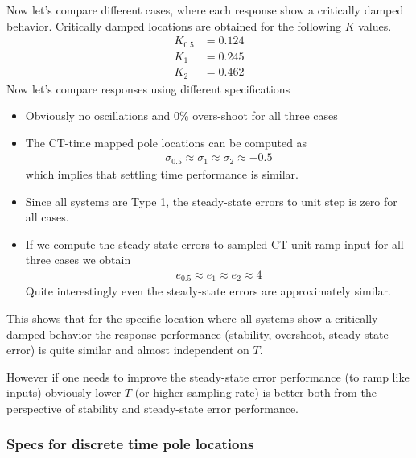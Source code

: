 \documentclass[twoside]{article}
\begin{document}
Now let's compare different cases, where each response
show a critically damped
behavior. Critically damped locations are obtained for
the following $K$ values. 
%
\begin{align*}
  K_{0.5} &= 0.124 \\
  K_{1} &= 0.245 \\
  K_{2} &= 0.462
\end{align*}
%
Now let's compare responses using different specifications
%
\begin{itemize}
  \item Obviously no oscillations and $0 \%$ overs-shoot for all three
    cases
  \item The CT-time mapped pole locations can be computed as
   \begin{align*}
  \sigma_{0.5} \approx \sigma_{1} \approx \sigma_{2} \approx -0.5
\end{align*}
    which implies that settling time performance is similar.

   \item Since all systems are Type 1, the steady-state errors to unit
     step is zero for all cases.

   \item If we compute the steady-state errors to sampled CT 
    unit ramp input for all three cases we obtain
%
\begin{align*}
e_{0.5} \approx e_{1} \approx e_{2} \approx 4
\end{align*}
%
Quite interestingly even the steady-state errors are
approximately similar. 
%
\end{itemize}
%
This shows that for the specific location where all
systems show a critically damped behavior
the response performance (stability, overshoot, steady-state error) 
is quite similar and almost independent on $T$. 

However if one needs to improve the steady-state
error performance (to ramp like inputs) obviously
lower $T$ (or higher sampling rate) is better
both from the perspective of stability and steady-state
error performance.



\subsubsection*{Specs for discrete time pole locations}
\end{document}

